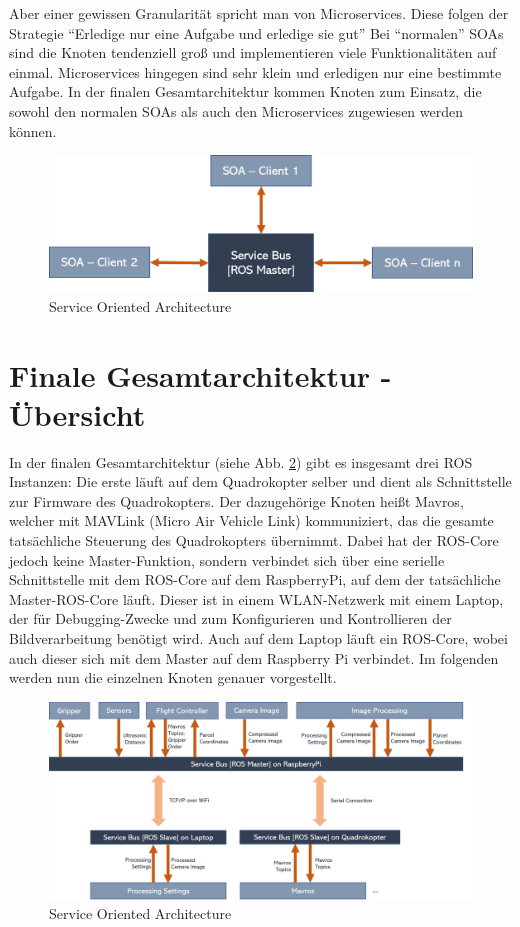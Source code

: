 Aber einer gewissen Granularität spricht man von Microservices. Diese folgen der Strategie 
``Erledige nur eine Aufgabe und erledige sie gut'' %
Bei ``normalen'' SOAs sind die Knoten tendenziell groß und implementieren viele Funktionalitäten auf einmal. Microservices hingegen sind sehr klein und erledigen nur eine bestimmte Aufgabe. In der finalen Gesamtarchitektur kommen Knoten zum Einsatz, die sowohl den normalen SOAs als auch den Microservices zugewiesen werden können.

\begin{figure}[h]
	\centering
	\includegraphics[scale=0.5]{"Grafiken/soa.png"}
	\caption{Service Oriented Architecture}
	\label{fig:meine-grafik}
\end{figure}

\section{Finale Gesamtarchitektur - Übersicht}
In der finalen Gesamtarchitektur (siehe Abb. \ref{fig:gesamtarch}) gibt es insgesamt drei ROS Instanzen: Die erste läuft auf dem Quadrokopter selber und dient als Schnittstelle zur Firmware des Quadrokopters. Der dazugehörige Knoten heißt Mavros, welcher mit MAVLink (Micro Air Vehicle Link) kommuniziert, das die gesamte tatsächliche Steuerung des Quadrokopters übernimmt. Dabei hat der ROS-Core jedoch keine Master-Funktion, sondern verbindet sich über eine serielle Schnittstelle mit dem ROS-Core auf dem RaspberryPi, auf dem der tatsächliche Master-ROS-Core läuft. Dieser ist in einem WLAN-Netzwerk mit einem Laptop, der für Debugging-Zwecke und zum Konfigurieren und Kontrollieren der Bildverarbeitung benötigt wird. Auch auf dem Laptop läuft ein ROS-Core, wobei auch dieser sich mit dem Master auf dem Raspberry Pi verbindet. Im folgenden werden nun die einzelnen Knoten genauer vorgestellt.

\begin{figure}[h]
	\centering
	\includegraphics[scale=0.41]{"Grafiken/gesamtarchitektur.png"}
	\caption{Service Oriented Architecture}
	\label{fig:gesamtarch}
\end{figure}

